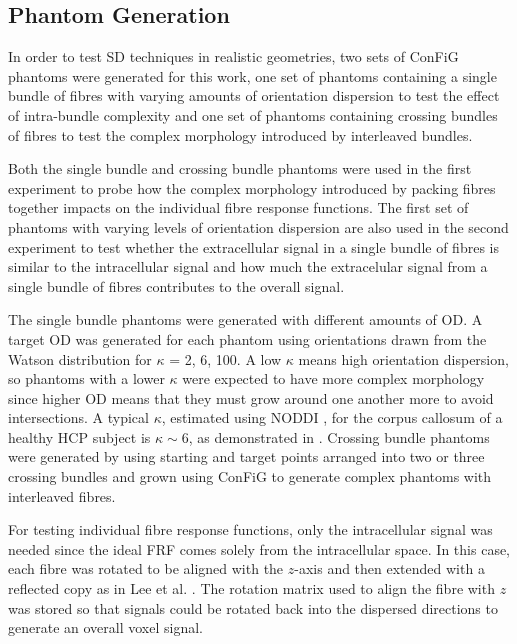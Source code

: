 \subsection{Phantom Generation}
\label{sec:frf_phantom_generation}
In order to test \ac{SD} techniques in realistic geometries, two sets of \ac{ConFiG} phantoms were generated for this work, one set of phantoms containing a single bundle of fibres with varying amounts of orientation dispersion to test the effect of intra-bundle complexity and one set of phantoms containing crossing bundles of fibres to test the complex morphology introduced by interleaved bundles.

Both the single bundle and crossing bundle phantoms were used in the first experiment to probe how the complex morphology introduced by packing fibres together impacts on the individual fibre response functions.
The first set of phantoms with varying levels of orientation dispersion are also used in the second experiment to test whether the extracellular signal in a single bundle of fibres is similar to the intracellular signal and how much the extracelular signal from a single bundle of fibres contributes to the overall signal.

The single bundle phantoms were generated with different amounts of \ac{OD}. A target \ac{OD} was generated for each phantom using orientations drawn from the Watson distribution \cite{Mardia2008} for $\kappa$ = 2, 6, 100.
A low $\kappa$ means high orientation dispersion, so phantoms with a lower $\kappa$ were expected to have more complex morphology since higher \ac{OD} means that they must grow around one another more to avoid intersections. A typical $\kappa$, estimated using \ac{NODDI} \cite{Zhang2012}, for the corpus callosum of a healthy \ac{HCP} \cite{Sotiropoulos2013a,VanEssen2012} subject is $\kappa \sim 6$, as demonstrated in .
Crossing bundle phantoms were generated by using starting and target points arranged into two or three crossing bundles and grown using \ac{ConFiG} to generate complex phantoms with interleaved fibres.

For testing individual fibre response functions, only the intracellular signal was needed since the ideal \ac{FRF} comes solely from the intracellular space. In this case, each fibre was rotated to be aligned with the $z$-axis and then extended with a reflected copy as in Lee et al. \cite{Lee2019a}. The rotation matrix used to align the fibre with $z$ was stored so that signals could be rotated back into the dispersed directions to generate an overall voxel signal.

